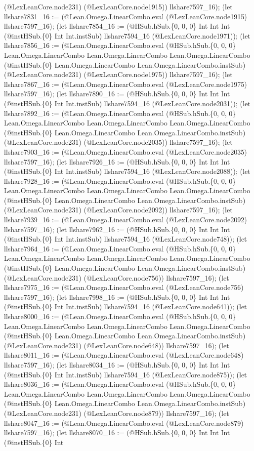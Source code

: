 \documentclass[11pt]{article}
\begin{document}
(@LexLeanCore.node231) (@LexLeanCore.node1915)) llshare7597\_16); (let llshare7831\_16 := (@Lean.Omega.LinearCombo.eval (@LexLeanCore.node1915) llshare7597\_16); (let llshare7854\_16 := (@HSub.hSub.\{0, 0, 0\} Int Int Int (@instHSub.\{0\} Int Int.instSub) llshare7594\_16 (@LexLeanCore.node1971)); (let llshare7856\_16 := (@Lean.Omega.LinearCombo.eval (@HSub.hSub.\{0, 0, 0\} Lean.Omega.LinearCombo Lean.Omega.LinearCombo Lean.Omega.LinearCombo (@instHSub.\{0\} Lean.Omega.LinearCombo Lean.Omega.LinearCombo.instSub) (@LexLeanCore.node231) (@LexLeanCore.node1975)) llshare7597\_16); (let llshare7867\_16 := (@Lean.Omega.LinearCombo.eval (@LexLeanCore.node1975) llshare7597\_16); (let llshare7890\_16 := (@HSub.hSub.\{0, 0, 0\} Int Int Int (@instHSub.\{0\} Int Int.instSub) llshare7594\_16 (@LexLeanCore.node2031)); (let llshare7892\_16 := (@Lean.Omega.LinearCombo.eval (@HSub.hSub.\{0, 0, 0\} Lean.Omega.LinearCombo Lean.Omega.LinearCombo Lean.Omega.LinearCombo (@instHSub.\{0\} Lean.Omega.LinearCombo Lean.Omega.LinearCombo.instSub) (@LexLeanCore.node231) (@LexLeanCore.node2035)) llshare7597\_16); (let llshare7903\_16 := (@Lean.Omega.LinearCombo.eval (@LexLeanCore.node2035) llshare7597\_16); (let llshare7926\_16 := (@HSub.hSub.\{0, 0, 0\} Int Int Int (@instHSub.\{0\} Int Int.instSub) llshare7594\_16 (@LexLeanCore.node2088)); (let llshare7928\_16 := (@Lean.Omega.LinearCombo.eval (@HSub.hSub.\{0, 0, 0\} Lean.Omega.LinearCombo Lean.Omega.LinearCombo Lean.Omega.LinearCombo (@instHSub.\{0\} Lean.Omega.LinearCombo Lean.Omega.LinearCombo.instSub) (@LexLeanCore.node231) (@LexLeanCore.node2092)) llshare7597\_16); (let llshare7939\_16 := (@Lean.Omega.LinearCombo.eval (@LexLeanCore.node2092) llshare7597\_16); (let llshare7962\_16 := (@HSub.hSub.\{0, 0, 0\} Int Int Int (@instHSub.\{0\} Int Int.instSub) llshare7594\_16 (@LexLeanCore.node748)); (let llshare7964\_16 := (@Lean.Omega.LinearCombo.eval (@HSub.hSub.\{0, 0, 0\} Lean.Omega.LinearCombo Lean.Omega.LinearCombo Lean.Omega.LinearCombo (@instHSub.\{0\} Lean.Omega.LinearCombo Lean.Omega.LinearCombo.instSub) (@LexLeanCore.node231) (@LexLeanCore.node756)) llshare7597\_16); (let llshare7975\_16 := (@Lean.Omega.LinearCombo.eval (@LexLeanCore.node756) llshare7597\_16); (let llshare7998\_16 := (@HSub.hSub.\{0, 0, 0\} Int Int Int (@instHSub.\{0\} Int Int.instSub) llshare7594\_16 (@LexLeanCore.node641)); (let llshare8000\_16 := (@Lean.Omega.LinearCombo.eval (@HSub.hSub.\{0, 0, 0\} Lean.Omega.LinearCombo Lean.Omega.LinearCombo Lean.Omega.LinearCombo (@instHSub.\{0\} Lean.Omega.LinearCombo Lean.Omega.LinearCombo.instSub) (@LexLeanCore.node231) (@LexLeanCore.node648)) llshare7597\_16); (let llshare8011\_16 := (@Lean.Omega.LinearCombo.eval (@LexLeanCore.node648) llshare7597\_16); (let llshare8034\_16 := (@HSub.hSub.\{0, 0, 0\} Int Int Int (@instHSub.\{0\} Int Int.instSub) llshare7594\_16 (@LexLeanCore.node875)); (let llshare8036\_16 := (@Lean.Omega.LinearCombo.eval (@HSub.hSub.\{0, 0, 0\} Lean.Omega.LinearCombo Lean.Omega.LinearCombo Lean.Omega.LinearCombo (@instHSub.\{0\} Lean.Omega.LinearCombo Lean.Omega.LinearCombo.instSub) (@LexLeanCore.node231) (@LexLeanCore.node879)) llshare7597\_16); (let llshare8047\_16 := (@Lean.Omega.LinearCombo.eval (@LexLeanCore.node879) llshare7597\_16); (let llshare8070\_16 := (@HSub.hSub.\{0, 0, 0\} Int Int Int (@instHSub.\{0\} Int 
\end{document}
